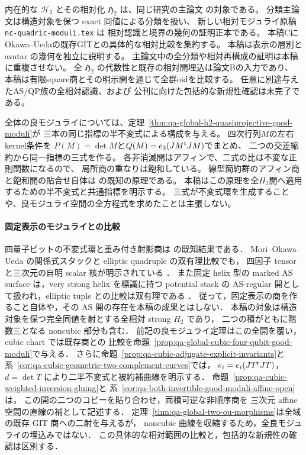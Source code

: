 \documentclass[a4paper,11pt]{ltjsarticle}
\numberwithin{equation}{section}
\theoremstyle{plain}
\theoremstyle{definition}
\theoremstyle{remark}
\newcommand{\HH}{\mathcal H_2}
\newcommand{\HHstack}{\mathfrak H_2}
\begin{document}
内在的な $\HH$ とその相対化 $\HHstack$ は、同じ研究の主論文
\cite{QuadricIntrinsic2026} の対象である。
分類主論文は構造対象を保つ exact 同値による分類を扱い、
新しい相対モジュライ原稿 \texttt{nc-quadric-moduli.tex} は
相対認識と境界の幾何の証明正本である。
本稿CにOkawa--Uedaの既存GITとの具体的な相対比較を集約する。
本稿は表示の層別と avatar の幾何を独立に説明する。
主論文中の全分類や相対再構成の証明は本稿に重複させない。
全 $\HHstack$ の代数性と既存の相対開埋込は論文Bの入力であり、
本稿は有限square商とその明示開を通じて全群oidを比較する。
任意に別途与えたAS/QP族の全相対認識、および
公刊に向けた包括的な新規性確認は未完了である。

全体の良モジュライについては、定理~\ref{thm:qa-global-h2-quasiprojective-good-moduli}が
三本の同じ指標の半不変式による構成を与える。
四次行列$M$の左右kernel条件を
$P(M)=\det M$と$Q(M)=e_3(JM^{\rm t}JM)$でまとめ、
二つの交差縮約から同一指標の三式を作る。
各非消滅開はアフィンで、二式の比は不変な正則関数になるので、
局所商の重なりは飽和している。
線型簡約群のアフィン商と飽和開の貼合せ自体は
\cite[Proposition 7.9, Theorems 13.2 and 13.6]{AlperGoodModuli2013}の既知の原理である。
本稿はこの原理を全$H_2$開へ適用するための半不変式と共通指標を明示する。
三式が不変式環を生成することや、良モジュライ空間の全方程式を求めたことは主張しない。

\paragraph{固定表示のモジュライとの比較}
四量子ビットの不変式環と重み付き射影商は
\cite[\S3, (3.9)--(3.16)]{OU2014}の既知結果である．
Mori--Okawa--Ueda の関係式スタックと elliptic quadruple の双有理比較でも，
四因子 tensor と三次元の自明 scalar 核が明示されている
\cite[Theorem 1.1, \S5.3, (5.24)--(5.26)]{MOU2019}．
また固定 helix 型の marked AS surface は，very strong helix を標識に持つ
potential stack の AS-regular 開として扱われ，elliptic tuple との比較は双有理である
\cite[Definition 1.1, Theorem 6.4]{OU2025MarkedAS}．
従って，固定表示の商を作ること自体や，その AS 開の存在を本稿の成果とはしない．
本稿の対象は構造対象を保つ完全同値を射とする全相対 strong $H_2$ であり，
二つの積がともに階数三となる noncubic 部分も含む．
前記の良モジュライ定理はこの全開を覆い，cubic chart では既存商との
比較を命題~\ref{prop:qa-global-cubic-four-qubit-good-moduli}で与える．
さらに命題~\ref{prop:qa-cubic-adjugate-explicit-invariants}と
系~\ref{cor:qa-cubic-geometric-two-complement-curves}では，
$e_i=e_i(JT^{\rm t}JT)$，$d=\det T$ により二半不変式と被約補曲線を明示する．
命題~\ref{prop:qa-cubic-weighted-inversion-gluing}と
系~\ref{cor:qa-both-invertible-good-moduli-affine-open}は，
この開の二つのコピーを貼り合わせ，両積可逆な非順序商を
三次元 affine 空間の直線の補として記述する．
定理~\ref{thm:qa-global-two-ou-morphisms}は全域の既存 GIT 商への二射を与えるが，
noncubic 曲線を収縮するため，全良モジュライの埋込みではない．
この具体的な相対範囲の比較と，包括的な新規性の確認は区別する．
\end{document}
